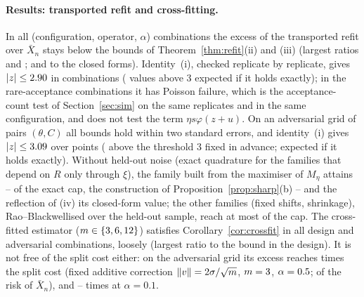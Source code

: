 \documentclass[10pt,a4paper]{article}
\theoremstyle{plain}
\theoremstyle{definition}
\theoremstyle{remark}
\newcommand{\norm}[1]{\lVert #1\rVert}
\begin{document}
\paragraph{Results: transported refit and cross-fitting.}
In all \RfDesignN{} (configuration, operator, $\alpha$) combinations the excess of the transported refit over $\bar X_n$ stays below the bounds of Theorem~\ref{thm:refit}(ii) and (iii) (largest ratios \RfDesignMaxB{} and \RfDesignMaxCap; \RfDesignMaxBc{} and \RfDesignMaxCapc{} to the closed forms). Identity~(i), checked replicate by replicate, gives $|z|\le2.90$ in \RfIdNz{} combinations (\RfIdExpected{} values above 3 expected if it holds exactly); in the \RfIdNPois{} rare-acceptance combinations it has \RfIdFail{} Poisson failure, which is the acceptance-count test of Section~\ref{sec:sim} on the same replicates and in the same configuration, and does not test the term $\eta s\varphi(z+u)$. On an adversarial grid of \RfAdvN{} pairs $(\theta,C)$ all bounds hold within two standard errors, and identity~(i) gives $|z|\le3.09$ over \RfAdvIdN{} points (\RfAdvIdAbove{} above the threshold 3 fixed in advance; \RfAdvIdExpected{} expected if it holds exactly). Without held-out noise (exact quadrature for the families that depend on $R$ only through $\xi$), the family built from the maximiser of $M_\eta$ attains \RfAdvWorstExMin--\RfAdvWorstExMax{} of the exact cap, the construction of Proposition~\ref{prop:sharp}(b) \RfAdvPropExMin--\RfAdvPropExMax{} and the reflection of (iv) its closed-form value; the other families (fixed shifts, shrinkage), Rao--Blackwellised over the held-out sample, reach at most \RfAdvRbNcMax{} of the cap. The cross-fitted estimator ($m\in\{3, 6, 12\}$) satisfies Corollary~\ref{cor:crossfit} in all \RfCfN{} design and \RfAcfN{} adversarial combinations, loosely (largest ratio \RfCfMaxB{} to the bound in the design). It is not free of the split cost either: on the adversarial grid its excess reaches \RfAcfMaxSplit{} times the split cost (fixed additive correction $\norm v=\RfAcfMaxSplitV\sigma/\sqrt m$, $m=3$, $\alpha=0.5$; \RfAcfMaxOverRn{} of the risk of $\bar X_n$), and \RfAcfTenMin--\RfAcfTenMax{} times at $\alpha=0.1$.
\end{document}
